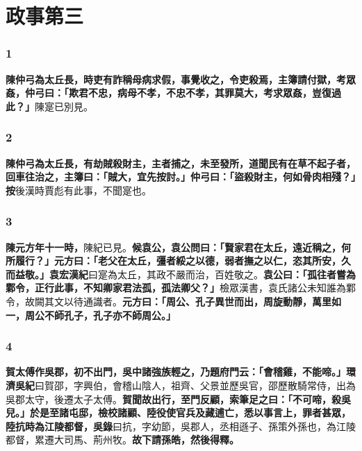 \chapter{政事第三}

\subsection*{1}

\textbf{陳仲弓為太丘長，時吏有詐稱母病求假，事覺收之，令吏殺焉，主簿請付獄，考眾姦，仲弓曰：「欺君不忠，病母不孝，不忠不孝，其罪莫大，考求眾姦，豈復過此？」}{\footnotesize 陳寔已別見。}

\subsection*{2}

\textbf{陳仲弓為太丘長，有劫賊殺財主，主者捕之，未至發所，道聞民有在草不起子者，回車往治之，主簿曰：「賊大，宜先按討。」仲弓曰：「盜殺財主，何如骨肉相殘？」}{\footnotesize \textbf{按}後漢時賈彪有此事，不聞寔也。}

\subsection*{3}

\textbf{陳元方年十一時，}{\footnotesize 陳紀已見。}\textbf{候袁公，袁公問曰：「賢家君在太丘，遠近稱之，何所履行？」元方曰：「老父在太丘，彊者綏之以德，弱者撫之以仁，恣其所安，久而益敬。」}{\footnotesize \textbf{袁宏漢紀}曰寔為太丘，其政不嚴而治，百姓敬之。}\textbf{袁公曰：「孤往者嘗為鄴令，正行此事，不知卿家君法孤，孤法卿父？」}{\footnotesize 檢眾漢書，袁氏諸公未知誰為鄴令，故闕其文以待通識者。}\textbf{元方曰：「周公、孔子異世而出，周旋動靜，萬里如一，周公不師孔子，孔子亦不師周公。」}

\subsection*{4}

\textbf{賀太傅作吳郡，初不出門，吳中諸強族輕之，乃題府門云：「會稽雞，不能啼。」}{\footnotesize \textbf{環濟吳紀}曰賀邵，字興伯，會稽山陰人，祖齊、父景並歷吳官，邵歷散騎常侍，出為吳郡太守，後遷太子太傅。}\textbf{賀聞故出行，至門反顧，索筆足之曰：「不可啼，殺吳兒。」於是至諸屯邸，檢校諸顧、陸役使官兵及藏逋亡，悉以事言上，罪者甚眾，陸抗時為江陵都督，}{\footnotesize \textbf{吳錄}曰抗，字幼節，吳郡人，丞相遜子、孫策外孫也，為江陵都督，累遷大司馬、荊州牧。}\textbf{故下請孫皓，然後得釋。}

